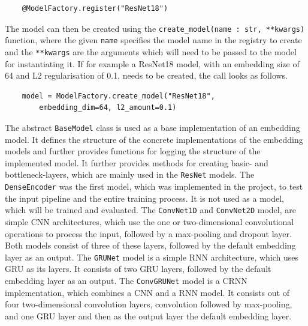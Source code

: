 \begin{verbatim}
    @ModelFactory.register("ResNet18")
\end{verbatim}
The model can then be created using the \texttt{create\_model(name : str, **kwargs)} function, where the given \texttt{name} specifies the model name in the registry to create and the \texttt{**kwargs} are the arguments which will need to be passed to the model for instantiating it. If for example a ResNet18 model, with an embedding size of 64 and L2 regularisation of 0.1, needs to be created, the call looks as follows.
\begin{verbatim}
    model = ModelFactory.create_model("ResNet18", 
        embedding_dim=64, l2_amount=0.1)
\end{verbatim}
The abstract \texttt{BaseModel} class is used as a base implementation of an embedding model. It defines the structure of the concrete implementations of the embedding models and further provides functions for logging the structure of the implemented model. It further provides methods for creating basic- and bottleneck-layers, which are mainly used in the \texttt{ResNet} models.
\newline
\newline
The \texttt{DenseEncoder} was the first model, which was implemented in the project, to test the input pipeline and the entire training process. It is not used as a model, which will be trained and evaluated.
\newline
\newline
The \texttt{ConvNet1D} and \texttt{ConvNet2D} model, are simple \gls{CNN} architectures, which use the one or two-dimensional convolutional operations to process the input, followed by a max-pooling and dropout layer. Both models consist of three of these layers, followed by the default embedding layer as an output.
\newline
\newline
The \texttt{GRUNet} model is a simple \gls{RNN} architecture, which uses \gls{GRU} as its layers. It consists of two \gls{GRU} layers, followed by the default embedding layer as an output.
\newline
\newline
The \texttt{ConvGRUNet} model is a \gls{CRNN} implementation, which combines a \gls{CNN} and a \gls{RNN} model. It consists out of four two-dimensional convolution layers, convolution followed by max-pooling, and one \gls{GRU} layer and then as the output layer the default embedding layer.
\newline
